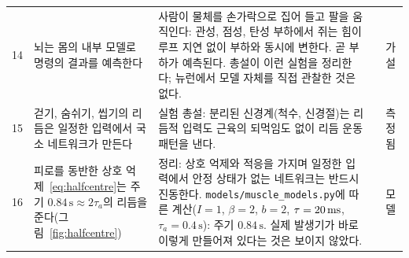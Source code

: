 {\begin{longtable}{>{\raggedright}p{0.5cm}>{\raggedright}p{4.0cm}>{\raggedright}p{5.6cm}>{\raggedright}p{2.3cm}>{\raggedright\arraybackslash}p{1.7cm}}
14 & 뇌는 몸의 내부 모델로 명령의 결과를 예측한다 & 사람이 물체를 손가락으로 집어 들고 팔을 움직인다: 관성, 점성, 탄성 부하에서 쥐는 힘이 루프 지연 없이 부하와 동시에 변한다. 곧 부하가 예측된다. 총설이 이런 실험을 정리한다; 뉴런에서 모델 자체를 직접 관찰한 것은 없다. & \cite{FlanaganWing1997grip, WolpertGhahramani2000} & 가설 \\
15 & 걷기, 숨쉬기, 씹기의 리듬은 일정한 입력에서 국소 네트워크가 만든다 & 실험 총설: 분리된 신경계(척수, 신경절)는 리듬적 입력도 근육의 되먹임도 없이 리듬 운동 패턴을 낸다. & \cite{MarderBucher2001} & 측정됨 \\
16 & 피로를 동반한 상호 억제~\eqref{eq:halfcentre}는 주기 $0.84\,\text{s}\approx2\tau_a$의 리듬을 준다(그림~\ref{fig:halfcentre}) & 정리: 상호 억제와 적응을 가지며 일정한 입력에서 안정 상태가 없는 네트워크는 반드시 진동한다. \texttt{models/\allowbreak muscle\_\allowbreak models.py}에 따른 계산($I=1$, $\beta=2$, $b=2$, $\tau=20\,\text{ms}$, $\tau_a=0.4\,\text{s}$): 주기 $0.84\,\text{s}$. 실제 발생기가 바로 이렇게 만들어져 있다는 것은 보이지 않았다. & \cite{Matsuoka1985osc} & 모델 \\
\bottomrule
\end{longtable}}
